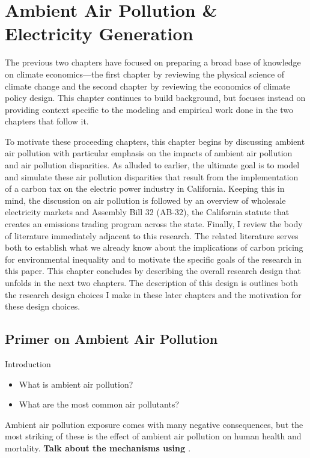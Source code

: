 \newpage
\section{Ambient Air Pollution \& Electricity Generation}

The previous two chapters have focused on preparing a broad base of knowledge on climate economics---the first chapter by reviewing the physical science of climate change and the second chapter by reviewing the economics of climate policy design. This chapter continues to build background, but focuses instead on providing context specific to the modeling and empirical work done in the two chapters that follow it. 

To motivate these proceeding chapters, this chapter begins by discussing ambient air pollution with particular emphasis on the impacts of ambient air pollution and air pollution disparities. As alluded to earlier, the ultimate goal is to model and simulate these air pollution disparities that result from the implementation of a carbon tax on the electric power industry in California. Keeping this in mind, the discussion on air pollution is followed by an overview of wholesale electricity markets and Assembly Bill 32 (AB-32), the California statute that creates an emissions trading program across the state. Finally, I review the body of literature immediately adjacent to this research. The related literature serves both to establish what we already know about the implications of carbon pricing for environmental inequality and to motivate the specific goals of the research in this paper. This chapter concludes by describing the overall research design that unfolds in the next two chapters. The description of this design is outlines both the research design choices I make in these later chapters and the motivation for these design choices. 

\subsection{Primer on Ambient Air Pollution}

\noindent Introduction
\begin{itemize}
    \item What is ambient air pollution? 
    \item What are the most common air pollutants?
\end{itemize}

Ambient air pollution exposure comes with many negative consequences, but the most striking of these is the effect of ambient air pollution on human health and mortality. \textbf{Talk about the mechanisms using \cite{aguilar2022air}}.

